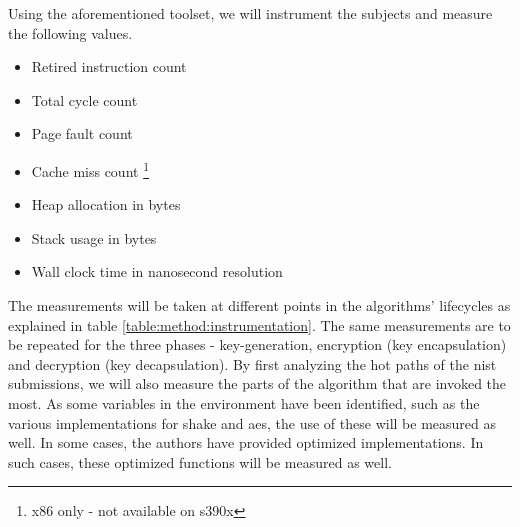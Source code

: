 
Using the aforementioned toolset, we will instrument the subjects and measure the following values.

\begin{itemize}
    \item Retired instruction count
    \item Total cycle count
    \item Page fault count
    \item Cache miss count \footnote{x86 only - not available on s390x}
    \item Heap allocation in bytes
    \item Stack usage in bytes
    \item Wall clock time in nanosecond resolution
\end{itemize}

The measurements will be taken at different points in the algorithms' lifecycles as explained in table \ref{table:method:instrumentation}. The same measurements are to be repeated for the three phases - key-generation, encryption (key encapsulation) and decryption (key decapsulation). By first analyzing the hot paths of the \gls{nist} submissions, we will also measure the parts of the algorithm that are invoked the most. As some variables in the environment have been identified, such as the various implementations for \gls{shake} and \gls{aes}, the use of these will be measured as well. In some cases, the authors have provided optimized implementations. In such cases, these optimized functions will be measured as well.

